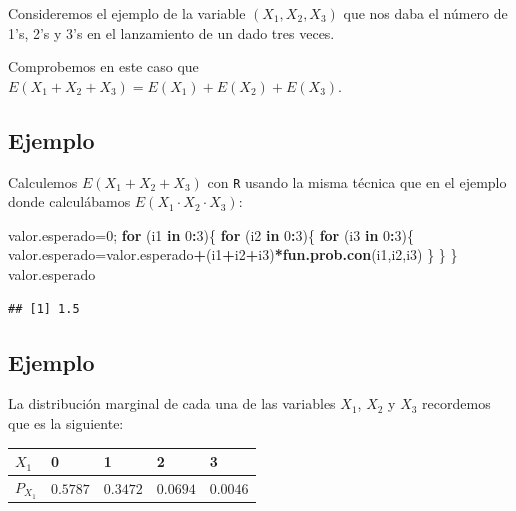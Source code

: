\documentclass[]{book}
\newenvironment{Shaded}{\begin{snugshade}}{\end{snugshade}}
\newcommand{\ControlFlowTok}[1]{\textcolor[rgb]{0.13,0.29,0.53}{\textbf{#1}}}
\newcommand{\DecValTok}[1]{\textcolor[rgb]{0.00,0.00,0.81}{#1}}
\newcommand{\KeywordTok}[1]{\textcolor[rgb]{0.13,0.29,0.53}{\textbf{#1}}}
\newcommand{\NormalTok}[1]{#1}
\newcommand{\OperatorTok}[1]{\textcolor[rgb]{0.81,0.36,0.00}{\textbf{#1}}}
\begin{document}
Consideremos el ejemplo de la variable \((X_1,X_2,X_3)\) que nos daba el número de 1's, 2's y 3's en el lanzamiento de un dado tres veces.

Comprobemos en este caso que \(E(X_1+X_2+X_3)=E(X_1)+E(X_2)+E(X_3)\).

\hypertarget{ejemplo-130}{%
\subsection{Ejemplo}\label{ejemplo-130}}

Calculemos \(E(X_1+X_2+X_3)\) con \texttt{R} usando la misma técnica que en el ejemplo donde calculábamos \(E(X_1\cdot X_2\cdot X_3)\):

\begin{Shaded}
\begin{Highlighting}[]
\NormalTok{valor.esperado=}\DecValTok{0}\NormalTok{;}
\ControlFlowTok{for}\NormalTok{ (i1 }\ControlFlowTok{in} \DecValTok{0}\OperatorTok{:}\DecValTok{3}\NormalTok{)\{}
  \ControlFlowTok{for}\NormalTok{ (i2 }\ControlFlowTok{in} \DecValTok{0}\OperatorTok{:}\DecValTok{3}\NormalTok{)\{}
    \ControlFlowTok{for}\NormalTok{ (i3 }\ControlFlowTok{in} \DecValTok{0}\OperatorTok{:}\DecValTok{3}\NormalTok{)\{}
\NormalTok{      valor.esperado=valor.esperado}\OperatorTok{+}\NormalTok{(i1}\OperatorTok{+}\NormalTok{i2}\OperatorTok{+}\NormalTok{i3)}\OperatorTok{*}\KeywordTok{fun.prob.con}\NormalTok{(i1,i2,i3)}
\NormalTok{    \}}
\NormalTok{  \}}
\NormalTok{\}}
\NormalTok{valor.esperado}
\end{Highlighting}
\end{Shaded}

\begin{verbatim}
## [1] 1.5
\end{verbatim}

\hypertarget{ejemplo-131}{%
\subsection{Ejemplo}\label{ejemplo-131}}

La distribución marginal de cada una de las variables \(X_1\), \(X_2\) y \(X_3\) recordemos que es la siguiente:

\begin{longtable}[]{@{}lllll@{}}
\toprule
\(X_1\) & 0 & 1 & 2 & 3\tabularnewline
\midrule
\endhead
\(P_{X_1}\) & \(0.5787\) & \(0.3472\) & \(0.0694\) & \(0.0046\)\tabularnewline
\bottomrule
\end{longtable}
\end{document}
